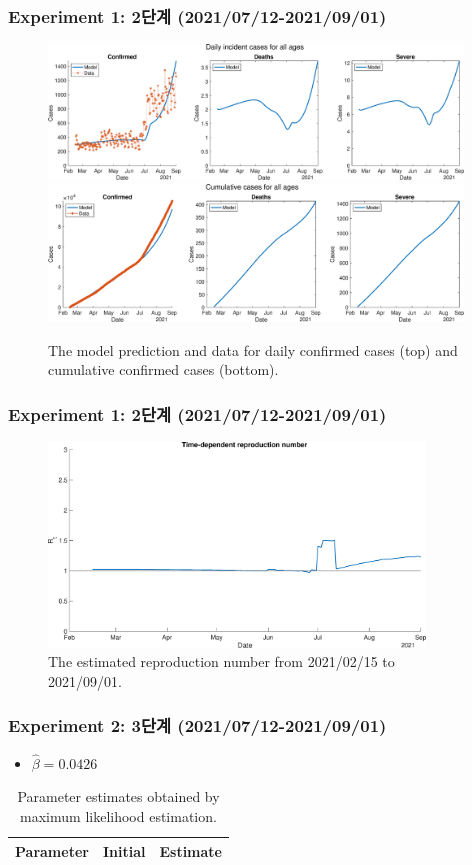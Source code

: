 \documentclass[aspectratio=169, 9pt, xcolor=dvipsnames]{beamer}
\begin{document}
	\begin{frame}\frametitle{Experiment 1: 2단계 (2021/07/12-2021/09/01)}
	    \begin{figure}
	    	\centering
	    	\includegraphics[width=11cm]{../results/estimate_sd_2nd_1/daily_all_age.eps}
	    	\includegraphics[width=11cm]{../results/estimate_sd_2nd_1/cumul_all_age.eps}
	    	\caption{The model prediction and data for daily confirmed cases (top) and cumulative confirmed cases (bottom).}
	    \end{figure}
	\end{frame}

	\begin{frame}\frametitle{Experiment 1: 2단계 (2021/07/12-2021/09/01)}
	    \begin{figure}
	    	\centering
	    	\includegraphics[width=10cm]{../results/estimate_sd_2nd_1/rep_num.eps}
	    	\caption{The estimated reproduction number from 2021/02/15 to 2021/09/01.}
	    \end{figure}
	\end{frame}

	\begin{frame}\frametitle{Experiment 2: 3단계 (2021/07/12-2021/09/01)}
	    \begin{itemize}
			\item $\hat{\beta} = 0.0426$
		\end{itemize}
	    \begin{table}
	    	\begin{tabular}{crr}
	    		\toprule
	    		\textbf{Parameter} & \textbf{Initial} & \textbf{Estimate} \\
	    		\midrule
	    		
	    		\bottomrule
	    	\end{tabular}
	    	\caption{Parameter estimates obtained by maximum likelihood estimation.}
	    \end{table}
	\end{frame}
\end{document}
